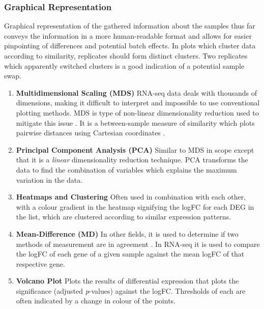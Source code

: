 \subsubsection{Graphical Representation}

Graphical representation of the gathered information about the samples thus far conveys the information in a more human-readable format and allows for easier pinpointing of differences and potential batch effects. In plots which cluster data according to similarity, replicates should form distinct clusters. Two replicates which apparently switched clusters is a good indication of a potential sample swap. 

\begin{enumerate}
\item[] \textbf{Multidimensional Scaling (MDS)} \hspace{0.15cm} RNA-seq data deals with thousands of dimensions, making it difficult to interpret and impossible to use conventional plotting methods. MDS is type of non-linear dimensionality reduction used to mitigate this issue \citep{yin2007nonlinear}. It is a between-sample measure of similarity which plots pairwise distances using Cartesian coordinates \citep{mead1992review}. 

\item[] \textbf{Principal Component Analysis (PCA)} \hspace{0.15cm} Similar to MDS in scope except that it is a \textit{linear} dimensionality reduction technique. PCA transforms the data to find the combination of variables which explains the maximum variation in the data. 

\item[] \textbf{Heatmaps and Clustering} \hspace{0.15cm} Often used in combination with each other, with a colour gradient in the heatmap signifying the  logFC for each \ac{DEG} in the list, which are clustered according to similar expression patterns.

\item[] \textbf{Mean-Difference (MD)} \hspace{0.15cm} In other fields, it is used to determine if two methods of measurement are in agreement \citep{fry2008visualizing}. In RNA-seq it is used to compare the \ac{logFC} of each gene of a given sample against the mean \ac{logFC} of that respective gene.

\item[] \textbf{Volcano Plot} \hspace{0.15cm} Plots the results of differential expression that plots the significance (adjusted \textit{p}-values) against the \ac{logFC}. Thresholds of each are often indicated by a change in colour of the points.
\end{enumerate} 


